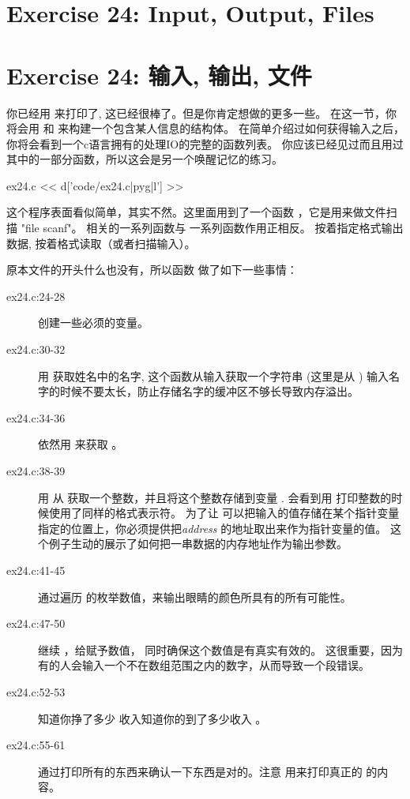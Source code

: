 \chapter{Exercise 24: Input, Output, Files}
\chapter{Exercise 24: 输入, 输出, 文件}

你已经用  来打印了, 这已经很棒了。但是你肯定想做的更多一些。 
在这一节，你将会用  和  来构建一个包含某人信息的结构体。
在简单介绍过如何获得输入之后，你将会看到一个c语言拥有的处理IO的完整的函数列表。
你应该已经见过而且用过其中的一部分函数，所以这会是另一个唤醒记忆的练习。

\begin{code}{ex24.c}
<< d['code/ex24.c|pyg|l'] >>
\end{code}

这个程序表面看似简单，其实不然。这里面用到了一个函数 ，它是用来做文件扫描 "file scanf"。
  相关的一系列函数与  一系列函数作用正相反。 
  按着指定格式输出数据,  按着格式读取（或者扫描输入）。

原本文件的开头什么也没有，所以函数  做了如下一些事情：

\begin{description}
\item[ex24.c:24-28] 创建一些必须的变量。
\item[ex24.c:30-32] 用 获取姓名中的名字, 这个函数从输入获取一个字符串
    (这里是从 ) 输入名字的时候不要太长，防止存储名字的缓冲区不够长导致内存溢出。
\item[ex24.c:34-36] 依然用 来获取 。
\item[ex24.c:38-39] 用 从 获取一个整数，并且将这个整数存储到变量
    .  会看到用 打印整数的时候使用了同样的格式表示符。
    为了让  可以把输入的值存储在某个指针变量指定的位置上，你必须提供把\emph{address} 的地址取出来作为指针变量的值。 
这个例子生动的展示了如何把一串数据的内存地址作为输出参数。
\item[ex24.c:41-45] 通过遍历  的枚举数值，来输出眼睛的颜色所具有的所有可能性。
\item[ex24.c:47-50] 继续  ，给赋予数值， 
    同时确保这个数值是有真实有效的。 这很重要，因为有的人会输入一个不在数组范围之内的数字，从而导致一个段错误。
\item[ex24.c:52-53] 知道你挣了多少 收入知道你的到了多少收入 。
\item[ex24.c:55-61] 通过打印所有的东西来确认一下东西是对的。注意  用来打印真正的 的内容。
\end{description}


